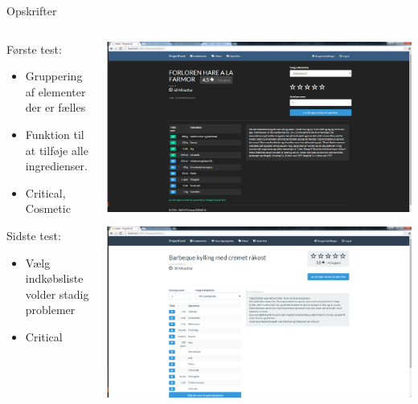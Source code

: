 \begin{frame}{Opskrifter}
	
	\begin{minipage}[0.3\textheight]{\textwidth}
	\begin{columns}[T]
	\begin{column}{0.5\textwidth}
	
	Første test:
	\begin{itemize}
	\item Gruppering af elementer der er fælles
	\item Funktion til at tilføje alle ingredienser.
	\item Critical, Cosmetic
	\end{itemize}
	Sidste test:
	\begin{itemize}
		\item Vælg indkøbsliste volder stadig problemer
		\item Critical
	\end{itemize}
	\end{column}
	\begin{column}{0.5\textwidth}
	 \includegraphics[width=1\textwidth,height=1\textheight,keepaspectratio, trim={1cm 0 0 16mm}, clip]{images/Screenshots/PickedRecipeOld.png}
	 
	 \vspace{2 mm}
	  
	  \includegraphics[width=1\textwidth,height=1\textheight,keepaspectratio, trim={1cm 0 0 16mm}, clip]{images/Screenshots/PickedRecipe.png}
	\end{column}
	\end{columns}
	

  \end{minipage}
  
  	
\end{frame}

